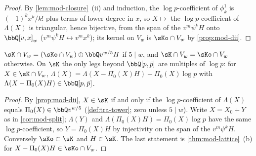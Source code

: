 \begin{proof}
By \cref{lem:mod-closure}~(ii) and induction, the $\log p$-coefficient of $\phi^1_k$ is $(-1)^kx^k/k!$ plus terms of lower degree in $x$, so $X\mapsto$ the $\log p$-coefficient of $\Lambda(X)$ is triangular, hence bijective, from the span of the $v^m\psi^kH$ onto $\bbQ[v,x]_w$ ($v^m\psi^kH\leftrightarrow v^mx^k$); its kernel on $V_w$ is $\sKo\cap V_w$ by \cref{prop:mod-dii}.
\end{proof}

\begin{cor}
\label{cor:mod-Ksplit}
$\sK\cap V_w=(\sKo\cap V_w)\oplus\bbQ v^{w/5}H$ if $5\mid w$, and $\sK\cap V_w=\sKo\cap V_w$ otherwise. On $\sK$ the only legs beyond $\bbQ[p,\bar p]$ are multiples of $\log p$: for $X\in\sK\cap V_w$, $\Lambda(X)=\Lambda(X-\Pi_0(X)H)+\Pi_0(X)\log p$ with $\Lambda(X-\Pi_0(X)H)\in\bbQ[p,\bar p]$.
\end{cor}

\begin{proof}
By \cref{prop:mod-dii}, $X\in\sK$ if and only if the $\log p$-coefficient of $\Lambda(X)$ equals $\Pi_0(X)\in\bbQ v^{w/5}$ (\cref{def:tra-tower}; zero unless $5\mid w$). Write $X=X_0+Y$ as in \cref{cor:mod-split}; $\Lambda(Y)$ and $\Lambda(\Pi_0(X)H)=\Pi_0(X)\log p$ have the same $\log p$-coefficient, so $Y=\Pi_0(X)H$ by injectivity on the span of the $v^m\psi^kH$. Conversely $\sKo\subset\sK$ and $H\in\sK$. The last statement is \cref{thm:mod-lattice}~(b) for $X-\Pi_0(X)H\in\sKo\cap V_w$.
\end{proof}



